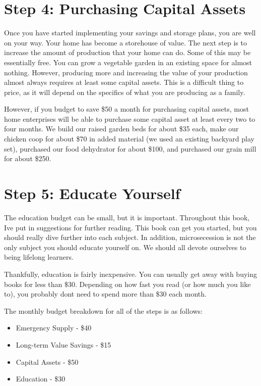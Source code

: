 \section{Step 4: Purchasing Capital Assets}

Once you have started implementing your savings and storage plans, you
are well on your way. Your home has become a storehouse of value. The
next step is to increase the amount of production that your home can
do. Some of this may be essentially free. You can grow a vegetable
garden in an existing space for almost nothing. However, producing more
and increasing the value of your production almost always requires at
least some capital assets. This is a difficult thing to price, as it
will depend on the specifics of what you are producing as a family.

However, if you budget to save \$50 a month for purchasing capital
assets, most home enterprises will be able to purchase some capital
asset at least every two to four months. We build our raised garden
beds for about \$35 each, make our chicken coop for about \$70 in added
material (we used an existing backyard play set), purchased our food
dehydrator for about \$100, and purchased our grain mill for about
\$250. 

\section{Step 5: Educate Yourself}

The education budget can be small, but it is important. Throughout this
book, I{\textquotesingle}ve put in suggestions for further reading.
This book can get you started, but you should really dive further into
each subject. In addition, microsecession is not the only subject you
should educate yourself on. We should all devote ourselves to being
lifelong learners.

Thankfully, education is fairly inexpensive. You can usually get away
with buying books for less than \$30. Depending on how fast you read
(or how much you like to), you probably don{\textquotesingle}t need to
spend more than \$30 each month. 

The monthly budget breakdown for all of the steps is as follows:

\begin{itemize}
\item 
Emergency Supply - \$40
\item 
Long-term Value Savings - \$15
\item 
Capital Assets - \$50
\item 
Education - \$30
\end{itemize}

